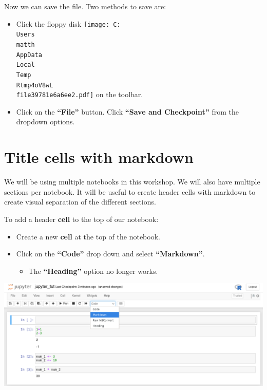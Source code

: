 \documentclass[
]{book}
\providecommand{\tightlist}{%
  \setlength{\itemsep}{0pt}\setlength{\parskip}{0pt}}
\begin{document}
Now we can save the file. Two methods to save are:

\begin{itemize}
\tightlist
\item
  Click the floppy disk
  \protect\texttt{[image: C:\\Users\\matth\\AppData\\Local\\Temp\\Rtmp4oV8wL\\file39781e6a6ee2.pdf]}
  on the toolbar.
\item
  Click on the \textbf{``File''} button. Click \textbf{``Save and Checkpoint''} from the dropdown options.
\end{itemize}

\hypertarget{title-cells-with-markdown}{%
\section{Title cells with markdown}\label{title-cells-with-markdown}}

We will be using multiple notebooks in this workshop. We will also have multiple sections per notebook. It will be useful to create header cells with markdown to create visual separation of the different sections.

To add a header \textbf{cell} to the top of our notebook:

\begin{itemize}
\tightlist
\item
  Create a new \textbf{cell} at the top of the notebook.
\item
  Click on the \textbf{``Code''} drop down and select \textbf{``Markdown''}.

  \begin{itemize}
  \tightlist
  \item
    The \textbf{``Heading''} option no longer works.
  \end{itemize}
\end{itemize}

\includegraphics{figures/jupyter_notebook_example_5.png}
\end{document}
